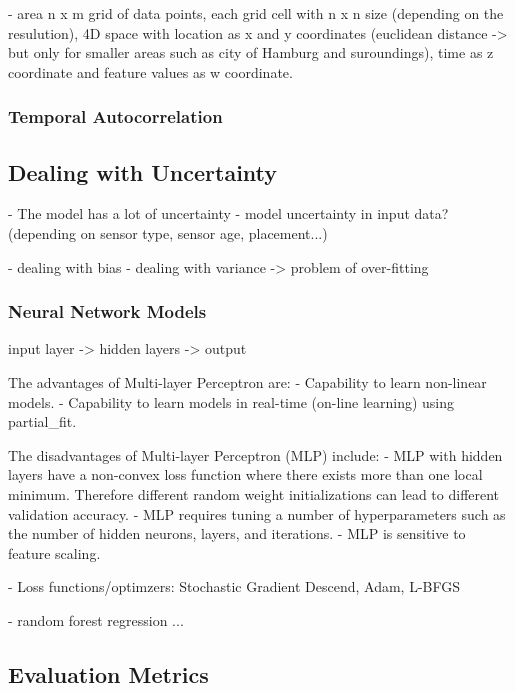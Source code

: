 - area n x m grid of data points, each grid cell with n x n size (depending on the resulution), 4D space with location as x and y coordinates (euclidean distance -> but only for smaller areas such as city of Hamburg and suroundings), time as z coordinate and feature values as w coordinate.\\

\subsubsection{Temporal Autocorrelation}





\subsection{Dealing with Uncertainty}
- The model has a lot of uncertainty
- model uncertainty in input data? (depending on sensor type, sensor age, placement...)

- dealing with bias
- dealing with variance
-> problem of over-fitting

\subsubsection{Neural Network Models}
input layer -> hidden layers -> output

The advantages of Multi-layer Perceptron are:
- Capability to learn non-linear models.
- Capability to learn models in real-time (on-line learning) using partial\_fit.

The disadvantages of Multi-layer Perceptron (MLP) include:
- MLP with hidden layers have a non-convex loss function where there exists more than one local minimum. Therefore different random weight initializations can lead to different validation accuracy.
- MLP requires tuning a number of hyperparameters such as the number of hidden neurons, layers, and iterations.
- MLP is sensitive to feature scaling.

- Loss functions/optimzers: Stochastic Gradient Descend, Adam, L-BFGS


- random forest regression
...

\subsection{Evaluation Metrics}
- Mean absolute error, mean absolute relative, mean quared error, r-squared, root mean squared error (RMSE)

